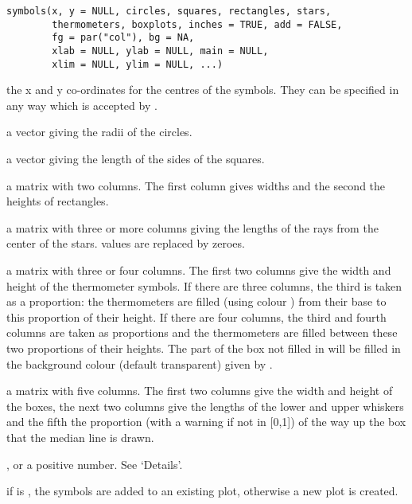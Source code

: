 %
\begin{Usage}
\begin{verbatim}
symbols(x, y = NULL, circles, squares, rectangles, stars,
        thermometers, boxplots, inches = TRUE, add = FALSE,
        fg = par("col"), bg = NA,
        xlab = NULL, ylab = NULL, main = NULL,
        xlim = NULL, ylim = NULL, ...)
\end{verbatim}
\end{Usage}
%
\begin{Arguments}
\begin{ldescription}
\item[\code{x, y}] the x and y co-ordinates for the centres of the symbols.
They can be specified in any way which is accepted by
.
\item[\code{circles}] a vector giving the radii of the circles.
\item[\code{squares}] a vector giving the length of the sides of the squares.
\item[\code{rectangles}] a matrix with two columns.  The first column gives
widths and the second the heights of rectangles.
\item[\code{stars}] a matrix with three or more columns giving the lengths
of the rays from the center of the stars.   values
are replaced by zeroes.
\item[\code{thermometers}] a matrix with three or four columns.  The first
two columns give the width and height of the thermometer symbols. If
there are three columns, the third is taken as a proportion: the
thermometers are filled (using colour ) from their base to
this proportion of their height.  If there are four columns, the
third and fourth columns are taken as proportions and the
thermometers are filled between these two proportions of their
heights.  The part of the box not filled in  will be filled
in the background colour (default transparent) given by .
\item[\code{boxplots}] a matrix with five columns.  The first two columns
give the width and height of the boxes, the next two columns
give the lengths of the lower and upper whiskers and the fifth
the proportion (with a warning if not in [0,1]) of the way up
the box that the median line is drawn.
\item[\code{inches}] ,  or a positive number.
See `Details'.
\item[\code{add}] if  is , the symbols are added to
an existing plot, otherwise a new plot is created.

\end{ldescription}
\end{Arguments}
